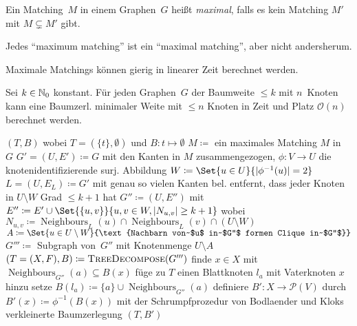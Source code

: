 \documentclass{cheat-sheet}
\newcommand{\size}[1]{\abs{#1}} %
\newcommand{\Powerset}{\mathcal{P}} %
\renewcommand{\O}{\mathcal{O}} %
\DeclareMathOperator{\Neighbours}{Neighbours} %
\newcommand{\IndentState}[1]{\State \quad #1}
\newcommand{\Youtube}[1]{\href{https://www.youtube.com/watch?v=#1}{\textcolor{YoutubeColor}{$\blacktriangleright$}}}
\begin{document}
\begin{defn}
  Ein Matching~$M$ in einem Graphen~$G$ heißt \emph{maximal}, falls es kein Matching $M'$ mit $M \subsetneq M'$ gibt.
\end{defn}

\begin{acht}[\Youtube{03PUwWef2Dg}, \Youtube{bOJC93XxoFc}]
  Jedes ``maximum matching'' ist ein ``maximal matching'', aber nicht andersherum.
\end{acht}

\begin{bem}[\Youtube{jtgBCGVux-8}]
  Maximale Matchings können gierig in linearer Zeit berechnet werden.
\end{bem}

\begin{satz}
  Sei $k \in \mathbb{N}_0$ konstant.
  Für jeden Graphen~$G$ der Baumweite $\leq k$ mit $n$~Knoten kann eine Baumzerl. minimaler Weite mit $\leq n$ Knoten in Zeit und Platz $\O(n)$ berechnet werden.
\end{satz}

\begin{algorithmic}
     \Return $(T, B)$ wobei $T = (\{ t \}, \emptyset)$ und $B : t \mapsto \emptyset$ \EndIf
    \State $M \coloneqq $ ein maximales Matching $M$ in~$G$
    \State $G' = (U, E') \coloneqq G$ mit den Kanten in $M$ zusammengezogen,
    \IndentState $\phi : V \to U$ die knotenidentifizierende surj. Abbildung
    \State $W \coloneqq \Set{u \in U}{\size{\phi^{-1}(u)} = 2}$
    \State $L = (U, E_L) \coloneqq G'$ mit genau so vielen Kanten bel. entfernt,
    \IndentState dass jeder Knoten in $U \setminus W$ Grad $\leq k + 1$ hat
    \State $G'' \coloneqq (U, E'')$ mit $E'' \coloneqq E' \cup \Set{\{ u, v \}}{u, v \in W, \size{N_{u,v}} \geq k+1}$
    \IndentState wobei $N_{u,v} \coloneqq \Neighbours_L(u) \cap \Neighbours_L(v) \cap (U \setminus W)$
    \State $A \coloneqq \Set{u \in U \setminus W}{\text{Nachbarn von~$u$ in~$G''$ formen Clique in~$G''$}}$
    \State $G''' \coloneqq$ Subgraph von~$G''$ mit Knotenmenge $U \setminus A$
    \State $(T = (X, F), B) \coloneqq \Call{TreeDecompose}{G'''}$
      \State finde $x \in X$ mit $\Neighbours_{G''}(a) \subseteq B(x)$
      \State füge zu $T$ einen Blattknoten $l_a$ mit Vaterknoten $x$ hinzu
      \State setze $B(l_a) \coloneqq \{ a \} \cup \Neighbours_{G''}(a)$
    \EndFor
    \State definiere $B' : X \to \Powerset(V)$ durch $B'(x) \coloneqq \phi^{-1}(B(x))$
    \State \Return mit der Schrumpfprozedur von Bodlaender und Kloks
    \IndentState verkleinerte Baumzerlegung $(T, B')$
  \EndFunction
\end{algorithmic}
\end{document}
